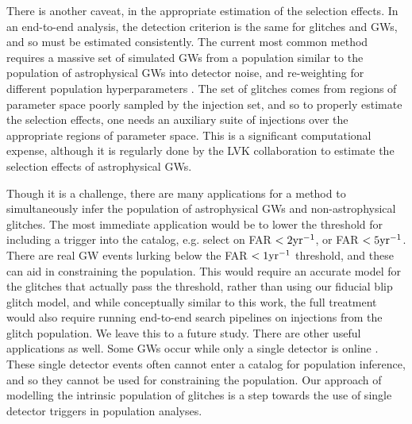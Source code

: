 \begin{refsection}
There is another caveat, in the appropriate estimation of the selection effects. In an end-to-end analysis, the detection criterion is the same for glitches and GWs, and so must be estimated consistently. The current most common method requires a massive set of simulated GWs from a population similar to the population of astrophysical GWs into detector noise, and re-weighting for different population hyperparameters \citep{PhysRevX.13.011048, LVK_injection_set}. The set of glitches comes from regions of parameter space poorly sampled by the injection set, and so to properly estimate the selection effects, one needs an auxiliary suite of injections over the appropriate regions of parameter space. This is a significant computational expense, although it is regularly done by the LVK collaboration to estimate the selection effects of astrophysical GWs.

Though it is a challenge, there are many applications for a method to simultaneously infer the population of astrophysical GWs and non-astrophysical glitches. The most immediate application would be to lower the threshold for including a trigger into the catalog, e.g. select on FAR $<2{\rm yr}^{-1}$, or FAR $<5{\rm yr}^{-1}$. There are real GW events lurking below the FAR $<1{\rm yr}^{-1}$ threshold, and these can aid in constraining the population. This would require an accurate model for the glitches that actually pass the threshold, rather than using our fiducial blip glitch model, and while conceptually similar to this work, the full treatment would also require running end-to-end search pipelines on injections from the glitch population. We leave this to a future study. There are other useful applications as well. Some GWs occur while only a single detector is online \citep{2017CQGra..34o5007C,2020ApJ...897..169N,2022CQGra..39u5012C}. These single detector events often cannot enter a catalog for population inference, and so they cannot be used for constraining the population. Our approach of modelling the intrinsic population of glitches is a step towards the use of single detector triggers in population analyses.


\end{refsection}
